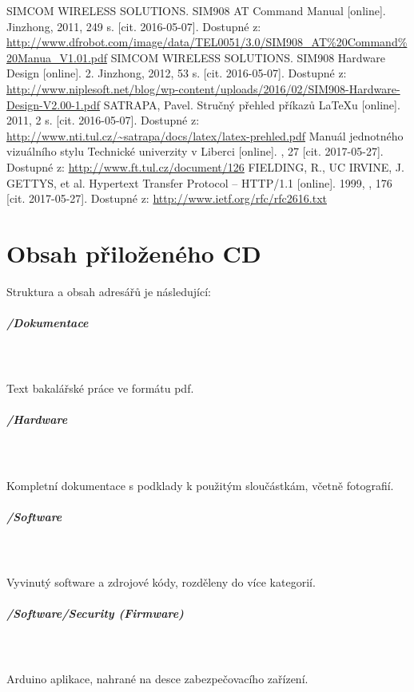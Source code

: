 \documentclass[FM,MP]{tulthesis}  %
\begin{document}
\begin{thebibliography}{10}
SIMCOM WIRELESS SOLUTIONS. SIM908 AT Command Manual [online]. Jinzhong, 2011, 249 s. [cit. 2016-05-07]. Dostupné z: \url{http://www.dfrobot.com/image/data/TEL0051/3.0/SIM908\_AT\%20Command\%20Manua\_V1.01.pdf}
SIMCOM WIRELESS SOLUTIONS. SIM908 Hardware Design [online]. 2. Jinzhong, 2012, 53 s. [cit. 2016-05-07]. Dostupné z: \url{http://www.niplesoft.net/blog/wp-content/uploads/2016/02/SIM908-Hardware-Design-V2.00-1.pdf}
SATRAPA, Pavel. Stručný přehled příkazů LaTeXu [online]. 2011, 2 s. [cit. 2016-05-07]. Dostupné z: \url{http://www.nti.tul.cz/~satrapa/docs/latex/latex-prehled.pdf}
Manuál jednotného vizuálního stylu Technické univerzity v Liberci [online]. , 27 [cit. 2017-05-27]. Dostupné z: \url{http://www.ft.tul.cz/document/126}
FIELDING, R., UC IRVINE, J. GETTYS, et al. Hypertext Transfer Protocol -- HTTP/1.1 [online]. 1999, , 176 [cit. 2017-05-27]. Dostupné z: \url{http://www.ietf.org/rfc/rfc2616.txt}
\end{thebibliography}


\appendix
\chapter{Obsah přiloženého CD}
Struktura a obsah adresářů je následující:

\paragraph{/Dokumentace}\mbox{}\\\mbox{}\\
Text bakalářské práce ve formátu pdf.

\paragraph{/Hardware}\mbox{}\\\mbox{}\\
Kompletní dokumentace s podklady k použitým sloučástkám, včetně fotografií.

\paragraph{/Software}\mbox{}\\\mbox{}\\
Vyvinutý software a zdrojové kódy, rozděleny do více kategorií.

\paragraph{/Software/Security (Firmware)}\mbox{}\\\mbox{}\\
Arduino aplikace, nahrané na desce zabezpečovacího zařízení.
\end{document}
